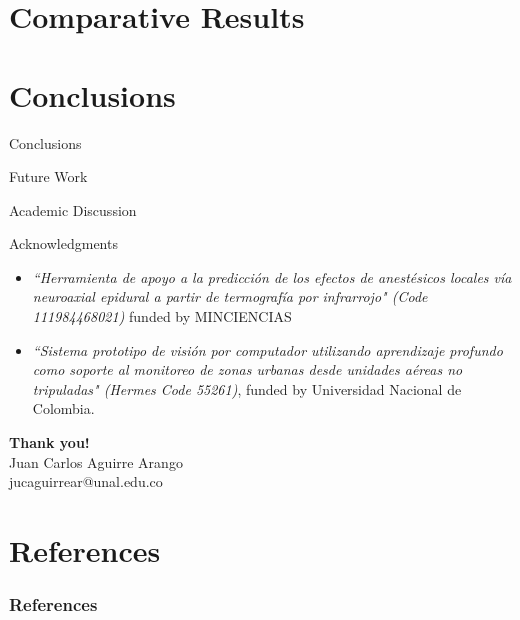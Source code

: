 \documentclass[aspectratio=169]{beamer}
\begin{document}
\section{Comparative Results}

\section{Conclusions}

\begin{frame}{Conclusions}
    
\end{frame}

\begin{frame}{Future Work}
    
\end{frame}

\begin{frame}{Academic Discussion}
    
\end{frame}


\begin{frame}{Acknowledgments}

\begin{itemize}
    \item \textit{``Herramienta de apoyo a la predicción de los efectos de anestésicos locales vía neuroaxial epidural a partir de termografía por infrarrojo" (Code 111984468021)} funded by MINCIENCIAS
    \item \textit{``Sistema prototipo de visión por computador utilizando aprendizaje profundo como soporte al monitoreo de zonas urbanas desde unidades aéreas no tripuladas" (Hermes Code 55261)}, funded by Universidad Nacional de Colombia.
\end{itemize}



\begin{center}
	{\large{\textbf{\textcolor[rgb]{0.00,0.00,1.00}{Thank you!}}}}\\
	\vspace{0.1cm}
	 Juan Carlos Aguirre Arango\\ \scriptsize{jucaguirrear@unal.edu.co}
\end{center}    
    
\end{frame}


\section{References}


\begin{frame}[allowframebreaks]
\frametitle{References}
{\tiny 


}
\end{frame}
\end{document}

